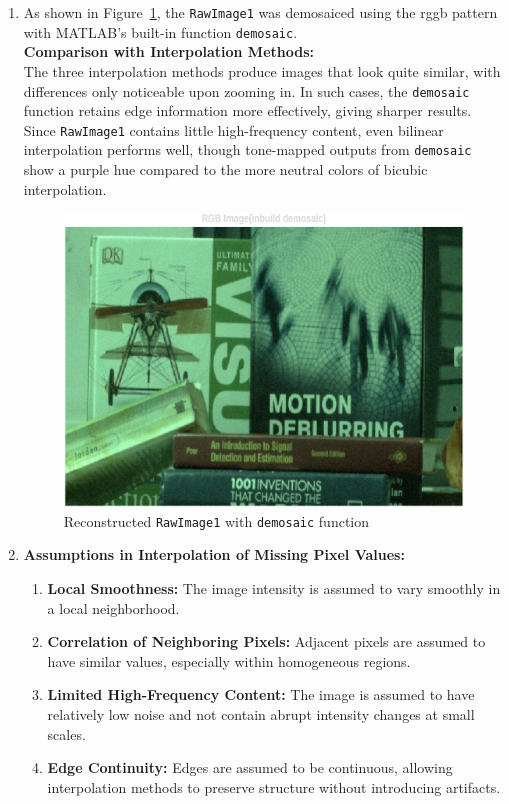 \documentclass[11pt, a4]{article}
\begin{document}
\begin{enumerate}
\begin{enumerate}
			\item As shown in Figure~\ref{fig:problem1_inbuild}, the \texttt{RawImage1} was demosaiced using the rggb pattern with MATLAB’s built-in function \texttt{demosaic}.\\
			\textbf{Comparison with Interpolation Methods:}\\
			The three interpolation methods produce images that look quite similar, with differences only noticeable upon zooming in. In such cases, the \texttt{demosaic} function retains edge information more effectively, giving sharper results. Since \texttt{RawImage1} contains little high-frequency content, even bilinear interpolation performs well, though tone-mapped outputs from \texttt{demosaic} show a purple hue compared to the more neutral colors of bicubic interpolation.  
			
			
			\begin{figure}[H]
				\centering
				\includegraphics[width=0.5\linewidth]{../output/1_RGB_inbuild.pdf}
				\caption{Reconstructed \texttt{RawImage1} with \texttt{demosaic} function}
				\label{fig:problem1_inbuild}
			\end{figure}
			\item \textbf{Assumptions in Interpolation of Missing Pixel Values:}  
			\begin{enumerate}
				\item \textbf{Local Smoothness:} The image intensity is assumed to vary smoothly in a local neighborhood.  
				\item \textbf{Correlation of Neighboring Pixels:} Adjacent pixels are assumed to have similar values, especially within homogeneous regions.  
				\item \textbf{Limited High-Frequency Content:} The image is assumed to have relatively low noise and not contain abrupt intensity changes at small scales.  
				\item \textbf{Edge Continuity:} Edges are assumed to be continuous, allowing interpolation methods to preserve structure without introducing artifacts.  
			\end{enumerate}
			

\end{enumerate}
\end{enumerate}
\end{document}
